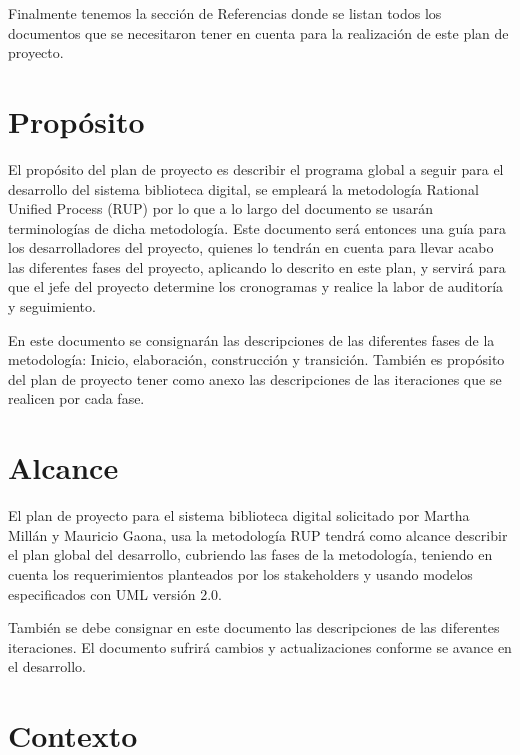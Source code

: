 \documentclass[]{article}
\begin{document}
Finalmente tenemos la sección de Referencias donde se listan todos los documentos que se
necesitaron tener en cuenta para la realización de este plan de proyecto.

\newpage
\tableofcontents
\newpage

	
\section{Propósito}
El propósito del plan de proyecto es describir el programa global a seguir para el desarrollo del
sistema biblioteca digital, se empleará la metodología Rational Unified Process (RUP) por lo que a lo
largo del documento se usarán terminologías de dicha metodología. Este documento será entonces una
guía para los desarrolladores del proyecto, quienes lo tendrán en cuenta para llevar acabo las
diferentes fases del proyecto, aplicando lo descrito en este plan, y servirá para que el jefe del
proyecto determine los cronogramas y realice la labor de auditoría y seguimiento. 

En este documento se consignarán las descripciones de las diferentes fases de la metodología: 
Inicio, elaboración, construcción y transición. También es propósito del plan de proyecto tener como
anexo las descripciones de las iteraciones que se realicen por cada  fase.

\section{Alcance}
El plan de proyecto para el sistema biblioteca digital solicitado por Martha Millán y Mauricio Gaona,
usa la metodología RUP tendrá como alcance describir el plan global del desarrollo, cubriendo las
fases de la metodología, teniendo en cuenta los requerimientos planteados por los stakeholders y
usando modelos especificados con UML versión 2.0. 

También se debe consignar en este documento las descripciones de las diferentes iteraciones. El
documento sufrirá cambios y actualizaciones conforme se avance en el desarrollo.

\section{Contexto}
\end{document}
